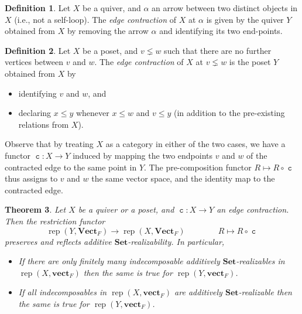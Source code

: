 \documentclass[a4paper]{amsart}
\theoremstyle{plain}
\newtheorem{theorem}{Theorem}[section]
\theoremstyle{definition}
\newtheorem{definition}[theorem]{Definition}
\theoremstyle{remark}
\newcommand{\funct}[1]{\operatorname{\mathtt{#1}}}
\newcommand{\Set}{\mathbf{Set}}
\newcommand{\VectF}{\mathbf{Vect}_F}
\newcommand{\vectF}{\mathbf{vect}_F}
\DeclareMathOperator{\rep}{rep}
\begin{document}
\begin{definition} \label{def:edge_contraction_quiver}
Let \( X \) be a quiver, and \( \alpha \) an arrow between two distinct objects in \( X \) (i.e., not a self-loop). The \emph{edge contraction} of \( X \) at \( \alpha \) is given by the quiver $Y$ obtained from \( X \) by removing the arrow \( \alpha \) and identifying its two end-points.
\end{definition}

\begin{definition}
Let \( X \) be a poset, and \( v \lneq w \) such that there are no further vertices between \( v \) and \( w \). The \emph{edge contraction} of \( X \) at \( v \lneq w \) is the poset $Y$ obtained from \( X \) by
\begin{itemize}
\item identifying \( v \) and \( w \), and
\item declaring \( x \leq y \) whenever \( x \leq w \) and \( v \leq y \) (in addition to the pre-existing relations from \( X \)).
\end{itemize}
\end{definition}

Observe that by treating $X$ as a category in either of the two cases, we have a functor $\funct{c}\colon X\to Y$ induced by mapping the two endpoints $v$ and $w$ of the contracted edge to the same point in $Y$. The pre-composition functor $R\mapsto R\circ \funct{c}$ thus assigns to $v$ and $w$ the same vector space, and the identity map to the contracted edge.

\begin{theorem}
\label{thm.edgecontraction}
Let \( X \) be a quiver or a poset, and \( \funct{c}\colon X \to Y \) an edge contraction. Then the restriction functor \[ \rep(Y, \VectF) \to \rep(X, \VectF) \qquad \qquad R\mapsto R\circ \funct{c}\] preserves and reflects additive \( \Set \)-realizability. In particular, 
\begin{itemize}
\item If there are only finitely many indecomposable additively \( \Set \)-realizables in \( \rep(X, \vectF) \) then the same is true for \( \rep(Y, \vectF) \).
\item If all indecomposables in \( \rep(X, \vectF) \) are additively \( \Set \)-realizable then the same is true for \( \rep(Y, \vectF) \).
\end{itemize}
\end{theorem}
\end{document}

